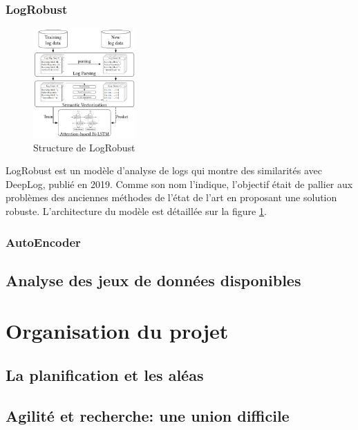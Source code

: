 \documentclass[openany, 12pt]{memoir}
\begin{document}
\subsection{LogRobust}

\begin{figure}[ht]
	\centering
	\includegraphics[width=0.35\textwidth]{images/logrobust.png}
	\caption{Structure de LogRobust}
	\label{logrobust}
\end{figure}

LogRobust \cite{logrobust} est un modèle d'analyse de \glspl{log} qui montre des similarités avec DeepLog, publié en 2019. Comme son nom l'indique, l'objectif était de pallier aux problèmes des anciennes méthodes de l'état de l'art en proposant une solution robuste. L'architecture du modèle est détaillée sur la figure \ref{logrobust}.

\subsection{AutoEncoder}

\section{Analyse des jeux de données disponibles}

\newpage 
\chapter{Organisation du projet}


\section{La planification et les aléas}


\section{Agilité et recherche: une union difficile}
\end{document}
